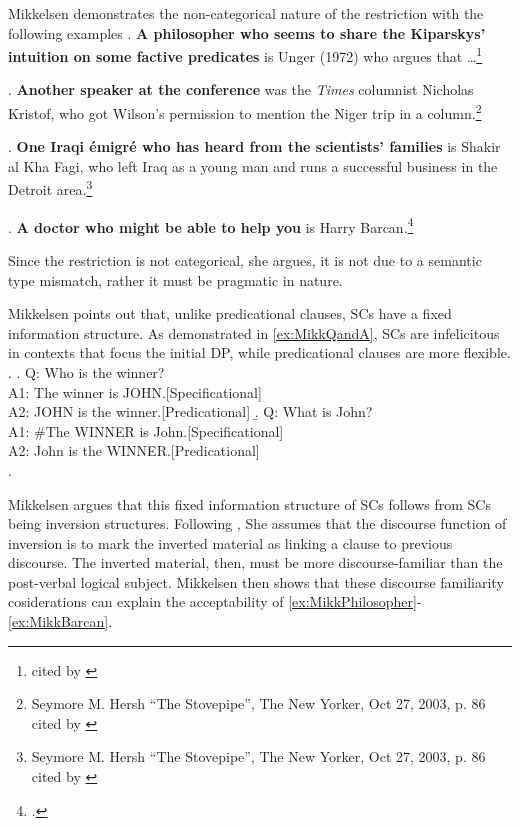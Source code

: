 \documentclass[GPFinal]{subfiles}
\begin{document}
Mikkelsen demonstrates the non-categorical nature of the restriction with the following examples
\ex.\label{ex:MikkPhilosopher} \textbf{A philosopher who seems to share the Kiparskys' intuition on some factive predicates} is Unger (1972) who argues that \dots\footnote{\textcite[][p. 195 fn8]{delacruz1976factives} cited by \textcite{mikkelsen2004specifying}}

\ex.\label{ex:MikkSpeaker} \textbf{Another speaker at the conference} was the \textit{Times} columnist Nicholas Kristof, who got Wilson's permission to mention the Niger trip in a column.\footnote{Seymore M. Hersh ``The Stovepipe'', The New Yorker, Oct 27, 2003, p. 86 cited by \textcite{mikkelsen2004specifying}}

\ex.\label{ex:MikkEmigre} \textbf{One Iraqi \'emigr\'e who has heard from the scientists' families} is Shakir al Kha Fagi, who left Iraq as a young man and runs a successful business in the Detroit area.\footnote{Seymore M. Hersh ``The Stovepipe'', The New Yorker, Oct 27, 2003, p. 86 cited by \textcite{mikkelsen2004specifying}}

\ex.\label{ex:MikkBarcan} \textbf{A doctor who might be able to help you} is Harry Barcan.\footcite{mikkelsen2004specifying}

Since the restriction is not categorical, she argues, it is not due to a semantic type mismatch, rather it must be pragmatic in nature.

Mikkelsen points out that, unlike predicational clauses, SCs have a fixed information structure.
As demonstrated in \ref{ex:MikkQandA}, SCs are infelicitous in contexts that focus the initial DP, while predicational clauses are more flexible.
\ex.\label{ex:MikkQandA}
\a. Q: Who is the winner?\\
A1: The winner is JOHN.\hfill[Specificational]\\
A2: JOHN is the winner.\hfill[Predicational]
\b. Q: What is John?\\
A1: \#The WINNER is John.\hfill[Specificational]\\
A2: John is the WINNER.\hfill[Predicational]\\
\z.

Mikkelsen argues that this fixed information structure of SCs follows from SCs being inversion structures.
Following \textcite{birner1994information,birner1996discourse}, She assumes that the discourse function of inversion is to mark the inverted material as linking a clause to previous discourse.
The inverted material, then, must be more discourse-familiar than the post-verbal logical subject.
Mikkelsen then shows that these discourse familiarity cosiderations can explain the acceptability of \ref{ex:MikkPhilosopher}-\ref{ex:MikkBarcan}.
\end{document}
